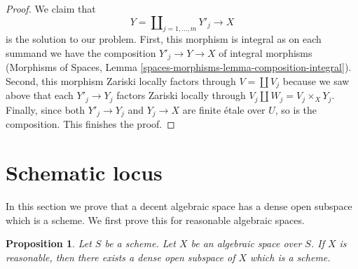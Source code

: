 \documentclass{stacks-project}
\theoremstyle{plain}
\newtheorem{proposition}[subsection]{Proposition}
\theoremstyle{definition}
\theoremstyle{remark}
\numberwithin{equation}{subsection}
\begin{document}
\begin{proof}
\medskip\noindent
We claim that
$$
Y = \coprod\nolimits_{j = 1, \ldots, m} Y'_j \longrightarrow X
$$
is the solution to our problem. First, this morphism is integral
as on each summand we have the composition $Y'_j \to Y \to X$
of integral morphisms (Morphisms of Spaces, Lemma
\ref{spaces-morphisms-lemma-composition-integral}). Second, this
morphism Zariski locally factors through $V = \coprod V_j$ because
we saw above that each $Y'_j \to Y_j$ factors Zariski locally through
$V_j \amalg W_j = V_j \times_X Y_j$. Finally, since both
$Y'_j \to Y_j$ and $Y_j \to X$ are finite \'etale over
$U$, so is the composition. This finishes the proof.
\end{proof}



















\section{Schematic locus}
\label{section-schematic}

\noindent
In this section we prove that a decent algebraic space has a dense open
subspace which is a scheme. We first prove this for reasonable algebraic
spaces.


\begin{proposition}
\label{proposition-reasonable-open-dense-scheme}
Let $S$ be a scheme. Let $X$ be an algebraic space over $S$.
If $X$ is reasonable, then there exists a dense open subspace
of $X$ which is a scheme.
\end{proposition}
\end{document}
